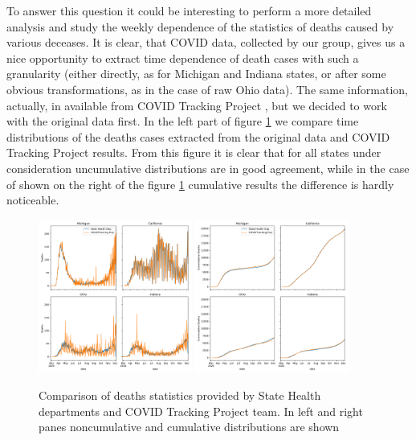 \documentclass[conference]{IEEEtran}
\begin{document}
To answer this question it could be interesting to perform a more detailed analysis and study the weekly dependence of the statistics of deaths caused by various deceases. It is clear, that COVID data, collected by our group, gives us a nice opportunity to extract time dependence of death cases with such a granularity (either directly, as for Michigan and Indiana states, or after some obvious transformations, as in the case of raw Ohio data). The same information, actually, in available from COVID Tracking Project \cite{covid19tracking_covid_nodate}, but we decided to work with the original data first. In the left part of figure \ref{fig:RT_comp} we compare time distributions of the deaths cases extracted from the original data and COVID Tracking Project results. From this figure it is clear that for all states under consideration uncumulative distributions are in good agreement, while in the case of shown on the right of the figure \ref{fig:RT_comp} cumulative results the difference is hardly noticeable.

\begin{figure}
  \centering
  \includegraphics[width=0.45\textwidth]{figs/raw_tracker_comp_nc}
  \includegraphics[width=0.45\textwidth]{figs/raw_tracker_comp_cum}
  \caption{Comparison of deaths statistics provided by State Health departments and COVID Tracking Project team. In left and right panes noncumulative and cumulative distributions are shown}
  \label{fig:RT_comp}
\end{figure}
\end{document}
